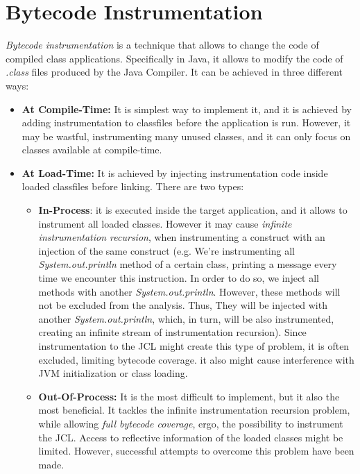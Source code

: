 \documentclass[]{usiinfthesis}
\begin{document}
\section{Bytecode Instrumentation}
\textit{Bytecode instrumentation} is a technique that allows to change the code of compiled class applications. Specifically in Java, it allows to modify the code of \textit{.class} files produced by the Java Compiler. It can be achieved in three different ways:
\begin{itemize}
    \item \textbf{At Compile-Time:} It is simplest way to implement it, and it is achieved by adding instrumentation to classfiles before the application is run. However, it may be wastful, instrumenting many unused classes, and it can only focus on classes available at compile-time.
    \item \textbf{At Load-Time:} It is achieved by injecting instrumentation code inside loaded classfiles before linking. There are two types:
    \begin{itemize}
        \item \textbf{In-Process}: it is executed inside the target application, and it allows to instrument all loaded classes. However it may cause \textit{infinite instrumentation recursion}, when instrumenting a construct with an injection of the same construct (e.g. We're instrumenting all \textit{System.out.println} method of a certain class, printing a message every time we encounter this instruction. In order to do so, we inject all methods with another \textit{System.out.println}. However, these methods will not be excluded from the analysis. Thus, They will be injected with another \textit{System.out.println}, which, in turn, will be also instrumented, creating an infinite stream of instrumentation recursion). Since instrumentation to the JCL might create this type of problem, it is often excluded, limiting bytecode coverage. it also might cause interference with JVM initialization or class loading.
        \item \textbf{Out-Of-Process:} It is the most difficult to implement, but it also the most beneficial. It tackles the infinite instrumentation recursion problem, while allowing \textit{full bytecode coverage}, ergo, the possibility to instrument the JCL. Access to reflective information of the loaded classes might be limited. However, successful attempts to overcome this problem have been made.
    \end{itemize}
\end{itemize}
\end{document}
